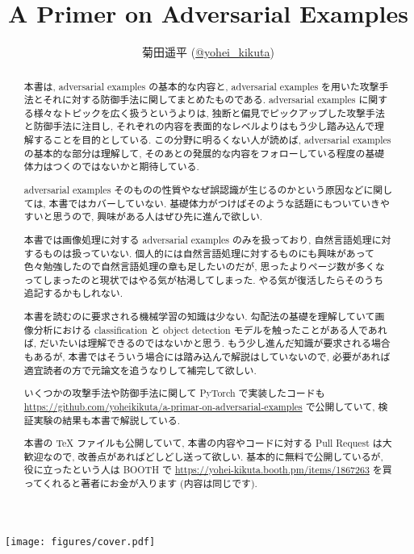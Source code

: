 \documentclass[dvipdfmx,autodetect-engine]{jsarticle}
\title{A Primer on Adversarial Examples}
\author{菊田遥平 (\href{https://twitter.com/yohei_kikuta}{@yohei\_kikuta})}
\begin{document}
\enlargethispage{\paperwidth}
\thispagestyle{empty}
\vspace*{1.0cm}
\vspace*{-\topmargin}
\vspace*{-\headheight}
\vspace*{-\headsep}
\vspace*{-\topskip}
\texttt{[image: figures/cover.pdf]}

\maketitle

\begin{abstract}
本書は, adversarial examples の基本的な内容と, adversarial examples を用いた攻撃手法とそれに対する防御手法に関してまとめたものである.
adversarial examples に関する様々なトピックを広く扱うというよりは, 独断と偏見でピックアップした攻撃手法と防御手法に注目し, それぞれの内容を表面的なレベルよりはもう少し踏み込んで理解することを目的としている.
この分野に明るくない人が読めば, adversarial examples の基本的な部分は理解して, そのあとの発展的な内容をフォローしている程度の基礎体力はつくのではないかと期待している.

adversarial examples そのものの性質やなぜ誤認識が生じるのかという原因などに関しては, 本書ではカバーしていない.
基礎体力がつけばそのような話題にもついていきやすいと思うので, 興味がある人はぜひ先に進んで欲しい.

本書では画像処理に対する adversarial examples のみを扱っており, 自然言語処理に対するものは扱っていない.
個人的には自然言語処理に対するものにも興味があって色々勉強したので自然言語処理の章も足したいのだが, 思ったよりページ数が多くなってしまったのと現状ではやる気が枯渇してしまった.
やる気が復活したらそのうち追記するかもしれない.

本書を読むのに要求される機械学習の知識は少ない.
勾配法の基礎を理解していて画像分析における classification と object detection モデルを触ったことがある人であれば, だいたいは理解できるのではないかと思う.
もう少し進んだ知識が要求される場合もあるが, 本書ではそういう場合には踏み込んで解説はしていないので, 必要があれば適宜読者の方で元論文を追うなりして補完して欲しい.

いくつかの攻撃手法や防御手法に関して PyTorch で実装したコードも \href{https://github.com/yoheikikuta/a-primar-on-adversarial-examples}{https://github.com/yoheikikuta/a-primar-on-adversarial-examples} で公開していて, 検証実験の結果も本書で解説している.

本書の TeX ファイルも公開していて, 本書の内容やコードに対する Pull Request は大歓迎なので, 改善点があればどしどし送って欲しい.
基本的に無料で公開しているが, 役に立ったという人は BOOTH で \href{https://yohei-kikuta.booth.pm/items/1867263}{https://yohei-kikuta.booth.pm/items/1867263} を買ってくれると著者にお金が入ります (内容は同じです).
\end{abstract}
\end{document}
